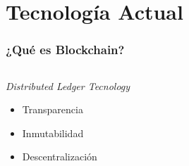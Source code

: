 \documentclass[usenames,dvipsnames]{beamer}
\begin{document}
\section{Tecnología Actual}
\begin{frame} 
\frametitle{¿Qué es Blockchain?} 
  \begin{columns}
  \begin{column}{0.5\textwidth}
    \center \textcolor{UniGold}{\emph{Distributed Ledger Tecnology}}
    \begin{itemize}
      \item Transparencia
      \item Inmutabilidad
      \item Descentralización
    \end{itemize}
  \end{column}
  \begin{column}{0.5\textwidth}
\end{column}
\end{columns}
\end{frame}
\end{document}
